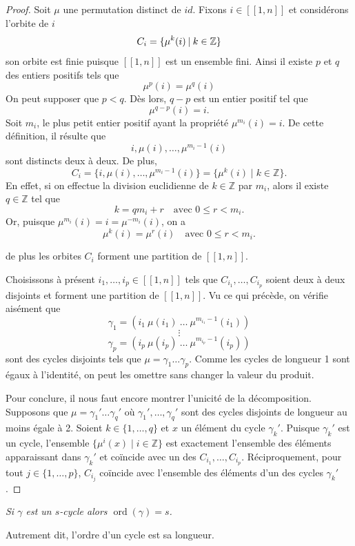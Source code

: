 \begin{proof}
Soit $\mu$ une permutation distinct de $id$. Fixons $i\in [[1,n]]$ et considérons l'orbite de $i$
\[
C_i=\{\mu^k(i)\: |\: k\in \mathbb{Z}\}
\]
son orbite est finie puisque $[[1,n]]$ est un ensemble fini. Ainsi il existe $p$ et $q$ des entiers positifs tels que
\[
\mu^p(i)=\mu^q(i)
\]
On peut supposer que \( p < q \). Dès lors, \( q - p \) est un entier positif tel que  
\[
\mu^{q - p}(i) = i.
\]
Soit \( m_i \), le plus petit entier positif ayant la propriété \( \mu^{m_i}(i) = i \).  
De cette définition, il résulte que  
\[
i, \mu(i), \dots, \mu^{m_i - 1}(i)
\]
sont distincts deux à deux. De plus,  
\[
C_i = \{ i, \mu(i), \dots, \mu^{m_i - 1}(i) \} = \{ \mu^k(i) \mid k \in \mathbb{Z} \}.
\]
En effet, si on effectue la division euclidienne de \( k \in \mathbb{Z} \) par \( m_i \), alors il existe \( q \in \mathbb{Z} \) tel que  
\[
k = q m_i + r \quad \text{avec } 0 \leq r < m_i.
\]
Or, puisque \( \mu^{m_i}(i) = i = \mu^{-m_i}(i) \), on a  
\[
\mu^k(i) = \mu^r(i) \quad \text{avec } 0 \leq r < m_i.
\]

de plus les orbites \( C_i \) forment une partition de \( [[1,n]] \).  


Choisissons à présent \( i_1, \dots, i_p \in [[1,n]] \) tels que \( C_{i_1}, \dots, C_{i_p} \) soient deux à deux disjoints et forment une partition de \( [[1,n]] \). Vu ce qui précède, on vérifie aisément que  
\[
\gamma_1 = ( i_1 \ \mu(i_1) \ \dots \ \mu^{m_{i_1} - 1}(i_1) )
\]
\[
\vdots
\]
\[
\gamma_p = ( i_p \ \mu(i_p) \ \dots \ \mu^{m_{i_p} - 1}(i_p) )
\]
sont des cycles disjoints tels que \( \mu = \gamma_1 \dots \gamma_p \).  
Comme les cycles de longueur 1 sont égaux à l’identité, on peut les omettre sans changer la valeur du produit.

Pour conclure, il nous faut encore montrer l’unicité de la décomposition.  
Supposons que \( \mu = \gamma_1' \dots \gamma_q' \) où \( \gamma_1', \dots, \gamma_q' \) sont des cycles disjoints de longueur au moins égale à 2.  
Soient \( k \in \{1, \dots, q\} \) et \( x \) un élément du cycle \( \gamma_k' \).  
Puisque \( \gamma_k' \) est un cycle, l’ensemble \( \{ \mu^i(x) \mid i \in \mathbb{Z} \} \) est exactement l’ensemble des éléments apparaissant dans \( \gamma_k' \)  
et coïncide avec un des \( C_{i_1}, \dots, C_{i_p} \).  
Réciproquement, pour tout \( j \in \{1, \dots, p\} \), \( C_{i_j} \) coïncide avec l’ensemble des éléments d’un des cycles \( \gamma_k' \).
\end{proof}

\begin{lemme}
        \textit{Si $\gamma$ est un $s$-cycle alors $\operatorname{ord}(\gamma) = s$.}

\medskip

Autrement dit, l’ordre d’un cycle est sa longueur.

    \end{lemme}

